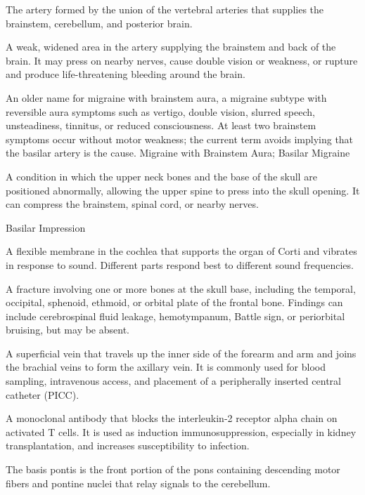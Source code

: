  The artery formed by the union of the vertebral arteries that supplies the brainstem, cerebellum, and posterior brain.

 A weak, widened area in the artery supplying the brainstem and back of the brain. It may press on nearby nerves, cause double vision or weakness, or rupture and produce life-threatening bleeding around the brain.

 An older name for migraine with brainstem aura, a migraine subtype with reversible aura symptoms such as vertigo, double vision, slurred speech, unsteadiness, tinnitus, or reduced consciousness. At least two brainstem symptoms occur without motor weakness; the current term avoids implying that the basilar artery is the cause.
\synonyms
Migraine with Brainstem Aura; Basilar Migraine

 A condition in which the upper neck bones and the base of the skull are positioned abnormally, allowing the upper spine to press into the skull opening. It can compress the brainstem, spinal cord, or nearby nerves.

\synonyms
Basilar Impression

 A flexible membrane in the cochlea that supports the organ of Corti and vibrates in response to sound. Different parts respond best to different sound frequencies.

 A fracture involving one or more bones at the
skull base, including the temporal, occipital, sphenoid, ethmoid, or orbital
plate of the frontal bone. Findings can include cerebrospinal fluid leakage,
hemotympanum, Battle sign, or periorbital bruising, but may be absent.

 A superficial vein that travels up the inner side of the forearm and arm and joins the brachial veins to form the axillary vein. It is commonly used for blood sampling, intravenous access, and placement of a peripherally inserted central catheter (PICC).

 A monoclonal antibody that blocks the interleukin-2 receptor alpha chain on activated T cells. It is used as induction immunosuppression, especially in kidney transplantation, and increases susceptibility to infection.

 The basis pontis is the front portion of the pons containing descending motor fibers and pontine nuclei that relay signals to the cerebellum.


